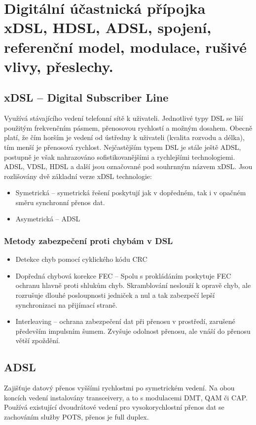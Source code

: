 \clearpage
\section{Digitální účastnická přípojka xDSL, HDSL, ADSL, spojení, referenční model, modulace, rušivé vlivy, přeslechy.}
\subsection{xDSL -- Digital Subscriber Line}

Využívá stávajícího vedení telefonní sítě k uživateli. Jednotlivé typy DSL se liší použitým frekvenčním pásmem, přenosovou
rychlostí a možným dosahem. Obecně platí, že čím horším je vedení od ústředny k uživateli (kvalita
rozvodu a délka), tím menší je přenosová rychlost. Nejčastějším typem DSL je stále ještě ADSL, postupně je však nahrazováno
sofistikovanějšími a rychlejšími technologiemi. ADSL, VDSL, HDSL a další jsou označované pod souhrnným názvem xDSL. Jsou rozlišovány dvě základní verze xDSL technologie:
\begin{itemize}
    \item Symetrická -- symetrická řešení poskytují jak v dopředném, tak i v opačném směru synchronní přenos dat.
    \item Asymetrická -- ADSL
\end{itemize}

\subsubsection{Metody zabezpečení proti chybám v DSL}
\begin{itemize}
    \item Detekce chyb pomocí cyklického kódu CRC
    \item Dopředná chybová korekce FEC -- Spolu s prokládáním poskytuje FEC ochranu hlavně proti shlukům chyb. Skramblování neslouží k opravě chyb, ale rozrušuje dlouhé posloupnosti jedniček a nul a tak zabezpečí lepší synchronizaci na přijímací straně.
    \item Interleaving -- ochrana zabezpečení dat při přenosu v prostředí, zarušené především impulsním šumem. Zvyšuje odolnost přenosu, ale vnáší do přenosu větší zpoždění.
\end{itemize}

\subsection{ADSL}
Zajišťuje datový přenos vyššími rychlostmi po symetrickém vedení. Na obou koncích vedení instalovány transceivery, a to s modulacemi DMT, QAM či CAP. Používá existující dvoudrátové vedení pro vysokorychlostní přenos dat se zachováním služby POTS, přenos je full duplex.
